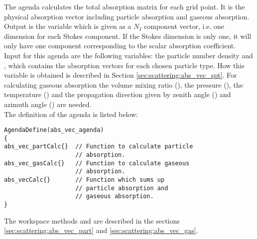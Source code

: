 The agenda  calculates the total absorption
matrix \AbsVec{}
for each grid point. It is the physical absorption vector including
particle absorption and gaseous absorption.\\
Output is the variable  which is given
as a $N_I$ component vector, i.e. one dimension for each Stokes component. If the
Stokes dimension is only one, it will only have one component
corresponding to the scalar absorption coefficient. \\
Input for this agenda are the following variables:
the particle number density  and 
, which contains the absorption vectors  for
each chosen particle type. How this variable is obtained
is described in Section \ref{sec:scattering:abs_vec_spt}. For calculating 
gaseous absorption the volume mixing ratio (), the
pressure  (), the temperature  () and the
propagation direction given by zenith angle () and
azimuth angle () are needed.\\
The definition of the agenda is listed below:

\vspace{2ex} 
\begin{minipage}[h]{.9\hsize}
\begin{verbatim}
AgendaDefine(abs_vec_agenda)
{
abs_vec_partCalc{}  // Function to calculate particle
                    // absorption.
abs_vec_gasCalc{}   // Function to calculate gaseous
                    // absorption.
abs_vecCalc{}       // Function which sums up 
                    // particle absorption and
                    // gaseous absorption.
}
\end{verbatim}
\end{minipage}
\vspace{2ex} 

\noindent
The workspace methods  and
 are described in the sections
\ref{sec:scattering:abs_vec_part} and
\ref{sec:scattering:abs_vec_gas}. 


\label{sec:scattering:abs_vec_part}

